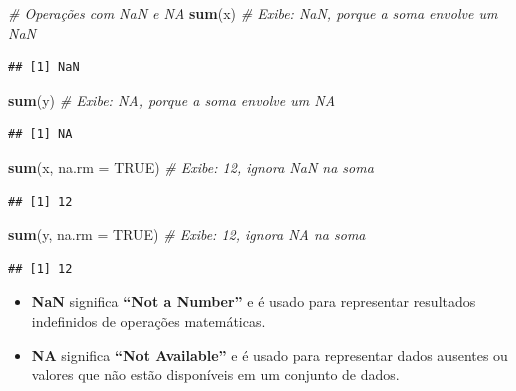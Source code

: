 \documentclass[
]{book}
\newenvironment{Shaded}{\begin{snugshade}}{\end{snugshade}}
\newcommand{\AttributeTok}[1]{\textcolor[rgb]{0.13,0.29,0.53}{#1}}
\newcommand{\CommentTok}[1]{\textcolor[rgb]{0.56,0.35,0.01}{\textit{#1}}}
\newcommand{\ConstantTok}[1]{\textcolor[rgb]{0.56,0.35,0.01}{#1}}
\newcommand{\FunctionTok}[1]{\textcolor[rgb]{0.13,0.29,0.53}{\textbf{#1}}}
\newcommand{\NormalTok}[1]{#1}
\begin{document}
\begin{Shaded}
\begin{Highlighting}[]
\CommentTok{\# Operações com NaN e NA}
\FunctionTok{sum}\NormalTok{(x)  }\CommentTok{\# Exibe: NaN, porque a soma envolve um NaN}
\end{Highlighting}
\end{Shaded}

\begin{verbatim}
## [1] NaN
\end{verbatim}

\begin{Shaded}
\begin{Highlighting}[]
\FunctionTok{sum}\NormalTok{(y)  }\CommentTok{\# Exibe: NA, porque a soma envolve um NA}
\end{Highlighting}
\end{Shaded}

\begin{verbatim}
## [1] NA
\end{verbatim}

\begin{Shaded}
\begin{Highlighting}[]
\FunctionTok{sum}\NormalTok{(x, }\AttributeTok{na.rm =} \ConstantTok{TRUE}\NormalTok{)  }\CommentTok{\# Exibe: 12, ignora NaN na soma}
\end{Highlighting}
\end{Shaded}

\begin{verbatim}
## [1] 12
\end{verbatim}

\begin{Shaded}
\begin{Highlighting}[]
\FunctionTok{sum}\NormalTok{(y, }\AttributeTok{na.rm =} \ConstantTok{TRUE}\NormalTok{)  }\CommentTok{\# Exibe: 12, ignora NA na soma}
\end{Highlighting}
\end{Shaded}

\begin{verbatim}
## [1] 12
\end{verbatim}

\begin{itemize}
\item
  \textbf{NaN} significa \textbf{``Not a Number''} e é usado para representar resultados indefinidos de operações matemáticas.
\item
  \textbf{NA} significa \textbf{``Not Available''} e é usado para representar dados ausentes ou valores que não estão disponíveis em um conjunto de dados.
\end{itemize}
\end{document}
